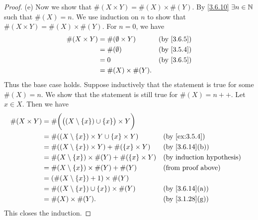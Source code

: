 \begin{proof}{(e)}
  Now we show that \(\#(X \times Y) = \#(X) \times \#(Y)\).
  By \cref{3.6.10} \(\exists n \in \mathbb{N}\) such that \(\#(X) = n\).
  We use induction on \(n\) to show that \(\#(X \times Y) = \#(X) \times \#(Y)\).
  For \(n = 0\), we have
  \begin{align*}
    \#(X \times Y) & = \#(\emptyset \times Y) &  & \by{3.6.5} \\
                   & = \#(\emptyset)          &  & \by{3.5.4} \\
                   & = 0                      &  & \by{3.6.5} \\
                   & = \#(X) \times \#(Y).
  \end{align*}
  Thus the base case holds.
  Suppose inductively that the statement is true for some \(\#(X) = n\).
  We show that the statement is still true for \(\#(X) = n++\).
  Let \(x \in X\).
  Then we have
  \begin{align*}
    \#(X \times Y) & = \#\bigg(\big((X \setminus \{x\}) \cup \{x\}\big) \times Y\bigg)                                   \\
                   & = \#((X \setminus \{x\}) \times Y \cup \{x\} \times Y)            &  & \by{ex:3.5.4}                \\
                   & = \#((X \setminus \{x\}) \times Y) + \#(\{x\} \times Y)           &  & \text{(by \cref{3.6.14}(b))} \\
                   & = \#(X \setminus \{x\}) \times \#(Y) + \#(\{x\} \times Y)         &  & \byIH                        \\
                   & = \#(X \setminus \{x\}) \times \#(Y) + \#(Y)                      &  & \text{(from proof above)}    \\
                   & = (\#(X \setminus \{x\}) + 1) \times \#(Y)                                                          \\
                   & = \#((X \setminus \{x\}) \cup \{x\}) \times \#(Y)                 &  & \text{(by \cref{3.6.14}(a))} \\
                   & = \#(X) \times \#(Y).                                             &  & \text{(by \cref{3.1.28}(g))}
  \end{align*}
  This closes the induction.
\end{proof}

